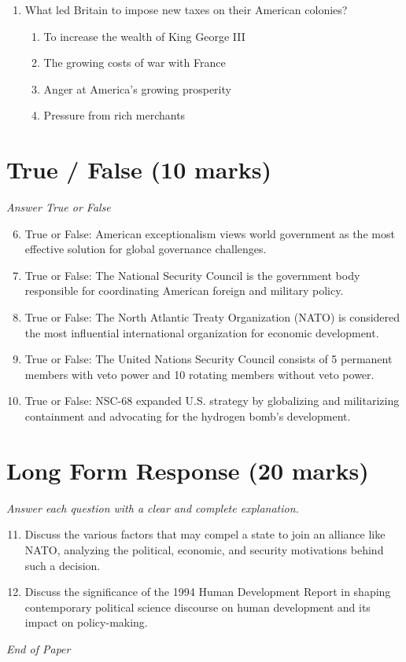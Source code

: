 \documentclass[12pt]{article}
\begin{document}
\begin{enumerate}[label=\arabic*.]
\begin{enumerate}[label=(\alph*)]
    \item It expanded NATO to include former Soviet states
    \item It focused on a more personal style of leadership
    \item It increased international support for the United States
\end{enumerate}
\item What led Britain to impose new taxes on their American colonies?
\begin{enumerate}[label=(\alph*)]
    \item To increase the wealth of King George III
    \item The growing costs of war with France
    \item Anger at America's growing prosperity
    \item Pressure from rich merchants
\end{enumerate}
\end{enumerate}

\section*{True / False (10 marks)}
\textit{Answer True or False}
\begin{enumerate}[label=\arabic*.]
\setcounter{enumi}{5}
\item True or False: American exceptionalism views world government as the most effective solution for global governance challenges.
\item True or False: The National Security Council is the government body responsible for coordinating American foreign and military policy.
\item True or False: The North Atlantic Treaty Organization (NATO) is considered the most influential international organization for economic development.
\item True or False: The United Nations Security Council consists of 5 permanent members with veto power and 10 rotating members without veto power.
\item True or False: NSC-68 expanded U.S. strategy by globalizing and militarizing containment and advocating for the hydrogen bomb's development.
\end{enumerate}

\section*{Long Form Response (20 marks)}
\textit{Answer each question with a clear and complete explanation.}
\begin{enumerate}[label=\arabic*.]
\setcounter{enumi}{10}
\item Discuss the various factors that may compel a state to join an alliance like NATO, analyzing the political, economic, and security motivations behind such a decision.
\item Discuss the significance of the 1994 Human Development Report in shaping contemporary political science discourse on human development and its impact on policy-making.
\end{enumerate}

\vfill
\noindent\textit{End of Paper}
\end{document}
